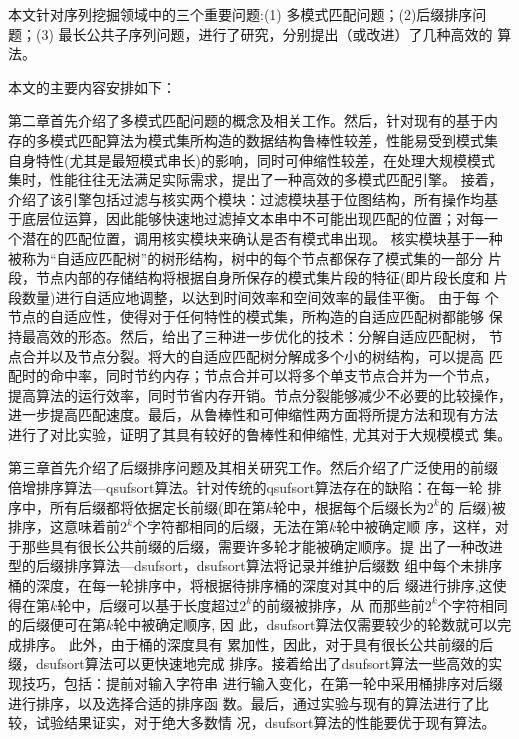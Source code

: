 本文针对序列挖掘领域中的三个重要问题:(1) 多模式匹配问题；(2)后缀排序问
题；(3) 最长公共子序列问题，进行了研究，分别提出（或改进）了几种高效的
算法。

本文的主要内容安排如下：

第二章首先介绍了多模式匹配问题的概念及相关工作。然后，针对现有的基于内
存的多模式匹配算法为模式集所构造的数据结构鲁棒性较差，性能易受到模式集
自身特性(尤其是最短模式串长)的影响，同时可伸缩性较差，在处理大规模模式
集时，性能往往无法满足实际需求，提出了一种高效的多模式匹配引擎。 接着，
介绍了该引擎包括过滤与核实两个模块：过滤模块基于位图结构，所有操作均基
于底层位运算，因此能够快速地过滤掉文本串中不可能出现匹配的位置；对每一
个潜在的匹配位置，调用核实模块来确认是否有模式串出现。 核实模块基于一种
被称为“自适应匹配树”的树形结构，树中的每个节点都保存了模式集的一部分
片段，节点内部的存储结构将根据自身所保存的模式集片段的特征(即片段长度和
片段数量)进行自适应地调整，以达到时间效率和空间效率的最佳平衡。 由于每
个节点的自适应性，使得对于任何特性的模式集，所构造的自适应匹配树都能够
保持最高效的形态。然后，给出了三种进一步优化的技术：分解自适应匹配树，
节点合并以及节点分裂。将大的自适应匹配树分解成多个小的树结构，可以提高
匹配时的命中率，同时节约内存；节点合并可以将多个单支节点合并为一个节点，
提高算法的运行效率，同时节省内存开销。节点分裂能够减少不必要的比较操作，
进一步提高匹配速度。最后，从鲁棒性和可伸缩性两方面将所提方法和现有方法
进行了对比实验，证明了其具有较好的鲁棒性和伸缩性, 尤其对于大规模模式
集。

第三章首先介绍了后缀排序问题及其相关研究工作。然后介绍了广泛使用的前缀
倍增排序算法---qsufsort算法。针对传统的qsufsort算法存在的缺陷：在每一轮
排序中，所有后缀都将依据定长前缀(即在第$k$轮中，根据每个后缀长为$2^k$的
后缀)被排序，这意味着前$2^k$个字符都相同的后缀，无法在第$k$轮中被确定顺
序，这样，对于那些具有很长公共前缀的后缀，需要许多轮才能被确定顺序。提
出了一种改进型的后缀排序算法---dsufsort，dsufsort算法将记录并维护后缀数
组中每个未排序桶的深度，在每一轮排序中，将根据待排序桶的深度对其中的后
缀进行排序,这使得在第$k$轮中，后缀可以基于长度超过$2^k$的前缀被排序，从
而那些前$2^k$个字符相同的后缀便可在第$k$轮中被确定顺序, 因
此，dsufsort算法仅需要较少的轮数就可以完成排序。 此外，由于桶的深度具有
累加性，因此，对于具有很长公共前缀的后缀，dsufsort算法可以更快速地完成
排序。接着给出了dsufsort算法一些高效的实现技巧，包括：提前对输入字符串
进行输入变化，在第一轮中采用桶排序对后缀进行排序，以及选择合适的排序函
数。最后，通过实验与现有的算法进行了比较，试验结果证实，对于绝大多数情
况，dsufsort算法的性能要优于现有算法。

